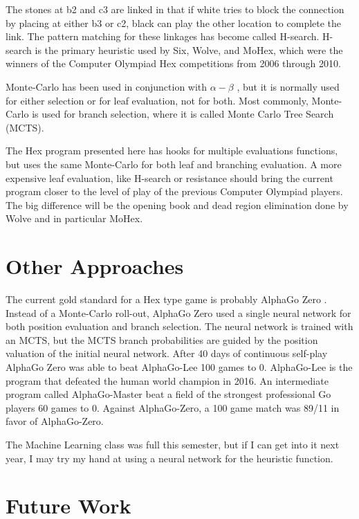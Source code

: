 \documentclass[12pt,titlepage]{amsart}
\begin{document}
The stones at b2 and c3 are linked in that if white tries to block the
connection by placing at either b3 or c2, black can play the other location to
complete the link. The pattern matching for these linkages has become called
H-search. H-search is the primary heuristic used by Six, Wolve, and MoHex, which
were the winners of the Computer Olympiad Hex competitions from 2006 through
2010.

Monte-Carlo has been used in conjunction with $\alpha-\beta$
\cite{arneson_hayward_henderson_2010}, but it is normally used for either
selection or for leaf evaluation, not for both. Most commonly, Monte-Carlo is
used for branch selection, where it is called Monte Carlo Tree Search (MCTS).

The Hex program presented here has hooks for multiple evaluations functions, but
uses the same Monte-Carlo for both leaf and branching evaluation. A more
expensive leaf evaluation, like H-search or resistance should bring the current
program closer to the level of play of the previous Computer Olympiad players.
The big difference will be the opening book and dead region elimination done by
Wolve and in particular MoHex.

\section{Other Approaches}

The current gold standard for a Hex type game is probably AlphaGo Zero
\cite{Silver2017}. Instead of a Monte-Carlo roll-out, AlphaGo Zero used a single
neural network for both position evaluation and branch selection. The neural
network is trained with an MCTS, but the MCTS branch probabilities are guided by
the position valuation of the initial neural network. After 40 days of
continuous self-play AlphaGo Zero was able to beat AlphaGo-Lee 100 games to 0.
AlphaGo-Lee is the program that defeated the human world champion in 2016. An
intermediate program called AlphaGo-Master beat a field of the strongest
professional Go players 60 games to 0. Against AlphaGo-Zero, a 100 game match
was 89/11 in favor of AlphaGo-Zero.

The Machine Learning class was full this semester, but if I can get into it next
year, I may try my hand at using a neural network for the heuristic function.

\section{Future Work}
\end{document}
